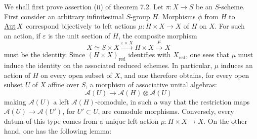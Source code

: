 We shall first prove assertion (ii) of theorem 7.2. Let $\pi:X\to S$ be an $S$-scheme. First consider an arbitrary infinitesimal $S$-group $H$. Morphisms $\phi$ from $H$ to $\underline{\operatorname{Aut}}\,X$ correspond bijectively to left actions $\mu:H\times X\to X$ of $H$ on $X$. For such an action, if $\varepsilon$ is the unit section of $H$, the composite morphism
\[
X\simeq S\times X\xrightarrow{\varepsilon\times X}H\times X\xrightarrow{\mu}X
\]
must be the identity. Since $(H\times X)_{\mathrm{red}}$ identifies with $X_{\mathrm{red}}$, one sees that $\mu$ must induce the identity on the associated reduced schemes. In particular, $\mu$ induces an action of $H$ on every open subset of $X$, and one therefore obtains, for every open subset $U$ of $X$ affine over $S$, a morphism of associative unital algebras:
\[
\mathscr A(U)\longrightarrow\mathscr A(H)\otimes\mathscr A(U)
\]
making $\mathscr A(U)$ a left $\mathscr A(H)$-comodule, in such a way that the restriction maps $\mathscr A(U)\to\mathscr A(U')$, for $U'\subset U$, are comodule morphisms. Conversely, every datum of this type comes from a unique left action $\mu:H\times X\to X$. On the other hand, one has the following lemma:

